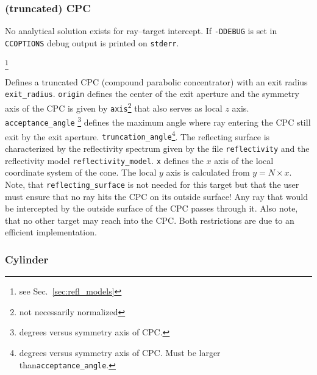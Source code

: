 \documentclass[10pt,a4paper,titlepage]{article}
\begin{document}
\subsubsection{(truncated) CPC}

No analytical solution exists for ray--target intercept. If {\tt -DDEBUG} is set in {\tt CCOPTIONS} debug output is printed on {\tt stderr}.









\footnote{see Sec.~\ref{sec:refl_models}}

\vspace{0.25cm}
Defines a truncated CPC (compound parabolic concentrator) with an exit radius {\tt exit\_radius}. {\tt origin} defines the center of the exit aperture and the symmetry axis of the CPC is given by {\tt axis}\footnote{not necessarily normalized} that also serves as local $z$ axis. {\tt acceptance\_angle} \footnote{degrees versus symmetry axis of CPC.} defines the maximum angle where ray entering the CPC still exit by the exit aperture. {\tt truncation\_angle}\footnote{degrees versus symmetry axis of CPC. Must be larger than{\tt acceptance\_angle}.}. The reflecting surface is characterized by the reflectivity spectrum given by the file {\tt reflectivity} and the reflectivity model {\tt reflectivity\_model}. {\tt x} defines the $x$ axis of the local coordinate system of the cone. The local $y$ axis is calculated from $y = N \times x$. Note, that {\tt reflecting\_surface} is not needed for this target but that the user must ensure that no ray hits the CPC on its outside surface! Any ray that would be intercepted by the outside surface of the CPC passes through it. Also note, that no other target may reach into the CPC. Both restrictions are due to an efficient implementation.

\subsubsection{Cylinder}
\end{document}
